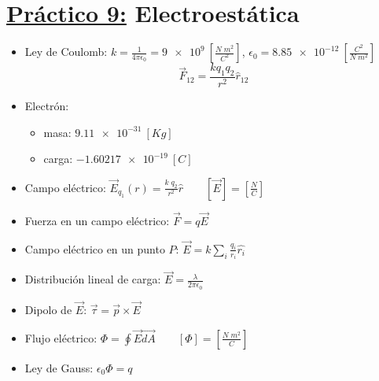 \documentclass[12pt,a4paper]{article}
\begin{document}
	\section*{\underline{Práctico 9:} Electroestática}
		\begin{multicols}{2}
			\begin{itemize}
				\item Ley de Coulomb: $k = \frac{1}{4 \pi \epsilon_{0}} = \SI{9e9}{} [\frac{N \; m^{2}}{C^{2}}] $,
					$\epsilon_{0} = \SI{8.85e-12}{} [\frac{C^{2}}{N \; m^{2}}]$
					\[
						\vec{F}_{12} = \frac{k q_{1} q_{2}}{r^{2}} \hat{r}_{12}
					\]
				\item Electrón:
					\begin{itemize}
						\item masa: $\SI{9.11e-31}{} [Kg]$
						\item carga: $- \SI{1.60217e-19}{} [C]$
					\end{itemize}
				\item Campo eléctrico: $\vec{E}_{q_{1}}(r) = \frac{k \; q_{2}}{r^{2}} \hat{r} \qquad [\vec{E}] = [\frac{N}{C}]$
				\item Fuerza en un campo eléctrico: $\vec{F} = q \vec{E}$
				\item Campo eléctrico en un punto $P$: $\vec{E} = k \sum_{i} \frac{q_{i}}{r_{i}} \hat{r_{i}}$
				\item Distribución lineal de carga: $\vec{E} = \frac{\lambda}{2\pi\epsilon_{0}}$
				\item Dipolo de $\vec{E}$: $\vec{\tau} = \vec{p} \times \vec{E}$
				\item Flujo eléctrico: $\Phi = \oint \vec{E} \vec{dA} \qquad [\Phi] = [\frac{N\; m^{2}}{C}]$
				\item Ley de Gauss: $\epsilon_{0} \Phi = q$
			\end{itemize}
		\end{multicols}
\end{document}
